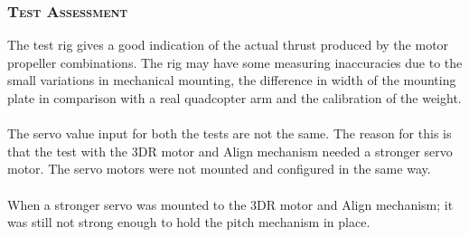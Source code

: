 \subsubsection*{\textsc{\medium Test Assessment}}
The test rig gives a good indication of the actual thrust produced by the motor propeller combinations. The rig may have some measuring inaccuracies due to the small variations in mechanical mounting, the difference in width of the mounting plate in comparison with a real quadcopter arm and the calibration of the weight.\\
\\
The servo value input for both the tests are not the same. The reason for this is that the test with the 3DR motor and Align mechanism needed a stronger servo motor. The servo motors were not mounted and configured in the same way.\\
\\
When a stronger servo was mounted to the 3DR motor and Align mechanism; it was still not strong enough to hold the pitch mechanism in place. \\
\\

\newpage
